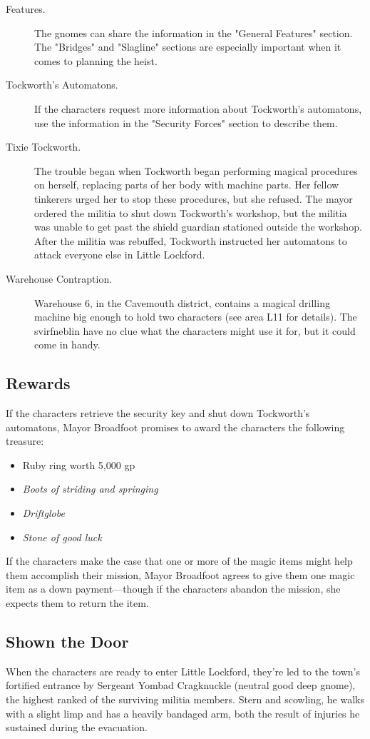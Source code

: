\documentclass[10pt,a4paper,twoside,bg=print,twocolumn,openany,nodeprecatedcode]{dndbook}
\begin{document}
\begin{description}
\item[Features.]
The gnomes can share the information in the "General Features" section. The "Bridges" and "Slagline" sections are especially important when it comes to planning the heist.
\item[Tockworth's Automatons.]
If the characters request more information about Tockworth's automatons, use the information in the "Security Forces" section to describe them.
\item[Tixie Tockworth.]
The trouble began when Tockworth began performing magical procedures on herself, replacing parts of her body with machine parts. Her fellow tinkerers urged her to stop these procedures, but she refused. The mayor ordered the militia to shut down Tockworth's workshop, but the militia was unable to get past the shield guardian stationed outside the workshop. After the militia was rebuffed, Tockworth instructed her automatons to attack everyone else in Little Lockford.
\item[Warehouse Contraption.]
Warehouse 6, in the Cavemouth district, contains a magical drilling machine big enough to hold two characters (see area L11 for details). The svirfneblin have no clue what the characters might use it for, but it could come in handy.
\end{description}

\subsection{Rewards}
If the characters retrieve the security key and shut down Tockworth's automatons, Mayor Broadfoot promises to award the characters the following treasure:


\begin{itemize}
\item Ruby ring worth 5,000 gp
\item \textit{Boots of striding and springing}
\item \textit{Driftglobe}
\item \textit{Stone of good luck}
\end{itemize}

If the characters make the case that one or more of the magic items might help them accomplish their mission, Mayor Broadfoot agrees to give them one magic item as a down payment—though if the characters abandon the mission, she expects them to return the item.

\subsection{Shown the Door}
When the characters are ready to enter Little Lockford, they're led to the town's fortified entrance by Sergeant Yombad Cragknuckle (neutral good deep gnome), the highest ranked of the surviving militia members. Stern and scowling, he walks with a slight limp and has a heavily bandaged arm, both the result of injuries he sustained during the evacuation.
\end{document}
